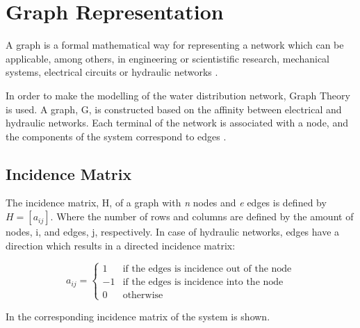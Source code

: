 \section{Graph Representation}  
\label{GraphTheory}
A graph is a formal mathematical way for representing a network which can be applicable, among others, 
in engineering or scientistific research, mechanical systems, electrical circuits or hydraulic networks \cite{graph_intro}. 

In order to make the modelling of the water distribution network, Graph Theory is used. A graph, G, is constructed based on the affinity between electrical and hydraulic networks. 
Each terminal of the network is associated with a node, and the components of the system correspond to edges \cite{GraphTheoryCarsten}. 
\subsection{Incidence Matrix} 

The incidence matrix, H, of a graph with \textit{n} nodes and \textit{e} edges is 
defined by $H = [a_{ij}]$. Where the number of rows and columns are defined by the amount of nodes, i, and edges, j, respectively.
In case of hydraulic networks, edges have a direction which results in a directed incidence matrix:

\begin{equation}
\label{DiGraph}
 a_{ij} =
		\left\{
		\begin{array}{ll}
		
		1 			&      \text{if the edges is incidence out of the node}	
\\
		-1                       &     \text{if the edges is incidence into the node}
\\

                0                       &      \text{otherwise}

		\end{array}
		\right.
\end{equation}	

In  the corresponding incidence matrix of the system is 
shown. %


